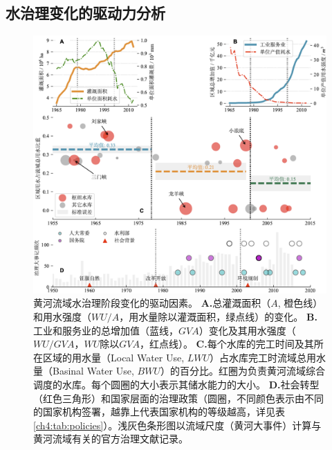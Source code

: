 




\subsection{水治理变化的驱动力分析}\label{ch4:sec:mechanism}

\begin{figure}[th!]
	\centering
	\includegraphics[width=\textwidth]{img/ch4/ch4_causes.png}
	\caption[黄河流域水治理阶段变化的驱动因素]{
		黄河流域水治理阶段变化的驱动因素。
		\textbf{A.}总灌溉面积（$A$, 橙色线）和用水强度（$WU/A$，用水量除以灌溉面积，绿点线）的变化。
        \textbf{B.}工业和服务业的总增加值（蓝线，$GVA$）变化及其用水强度（$WU/GVA$，$WU$除以$GVA$，红点线）。
        \textbf{C.}每个水库的完工时间及其所在区域的用水量（Local Water Use, $LWU$）占水库完工时流域总用水量（Basinal Water Use, $BWU$）的百分比。红圈为负责黄河流域综合调度的水库。每个圆圈的大小表示其储水能力的大小。
        \textbf{D.}社会转型（红色三角形）和国家层面的治理政策（圆圈，不同颜色表示由不同的国家机构签署，越靠上代表国家机构的等级越高，详见表\ref{ch4:tab:policies}）。浅灰色条形图以流域尺度（黄河大事件）计算与黄河流域有关的官方治理文献记录。}\label{ch4:fig:mechanism}
\end{figure}


